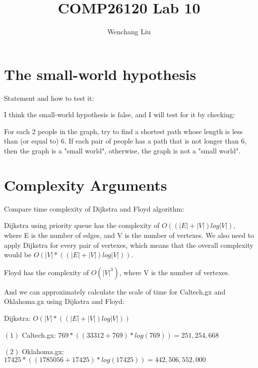 \documentclass{article}
\title{COMP26120 Lab 10}
\author{Wenchang Liu}
\begin{document}
\maketitle


\section{The small-world hypothesis}
\label{sec:small world}
Statement and how to test it:

I think the small-world hypothesis is false, and I will test for it by checking:

For each 2 people in the graph, try to find a shortest path whose length is less than (or equal to) 6. 
If each pair of people has a path that is not longer than 6, then the graph is a "small world", otherwise,
the graph is not a "small world".


\section{Complexity Arguments}
\label{sec:complexity}
Compare time complexity of Dijkstra and Floyd algorithm:

Dijkstra using priority queue has the complexity of $O\left(\left(|E|+|V|\right)log|V|\right)$, 
where E is the number of edges, and V is the number of vertexes. 
We also need to apply Dijkstra for every pair of vertexes,
which means that the overall complexity would be $O\left(|V|*\left(\left(|E|+|V|\right)log|V|\right)\right)$.

Floyd has the complexity of $O\left(|V|^3\right)$, where V is the number of vertexes.

And we can approximately calculate the scale of time for Caltech.gx and Oklahoma.gx using Dijkstra and Floyd:

Dijkstra: $O\left(|V|*\left(\left(|E|+|V|\right)log|V|\right)\right)$

$\left(1\right)$ Caltech.gx: $769*\left(\left(33312+769\right)*log\left(769\right)\right) = 251,254,668$

$\left(2\right)$ Oklahoma.gx: $17425*\left(\left(1785056+17425\right)*log\left(17425\right)\right) = 442,506,552,000$
\end{document}
